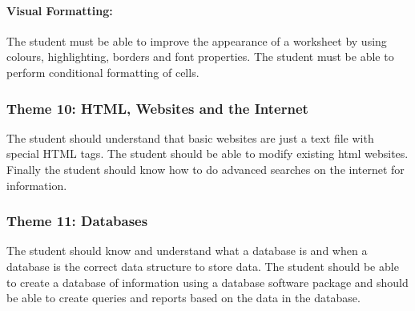             \paragraph{Visual Formatting:}
                The student must be able to improve the appearance of a worksheet
                by using colours, highlighting, borders and font properties. The
                student must be able to perform conditional formatting of cells.
        
            
        \subsubsection{Theme 10: HTML, Websites and the Internet}
            The student should understand that basic websites are just a 
            text file with special HTML tags. The student should be able to 
            modify existing html websites. Finally the student should know 
            how to do advanced searches on the internet for information.
        

        \subsubsection{Theme 11: Databases}
            The student should know and understand what a database is and when a 
            database is the correct data structure to store data. The student 
            should be able to create a database of information using a database 
            software package and should be able to create queries and reports 
            based on the data in the database.
